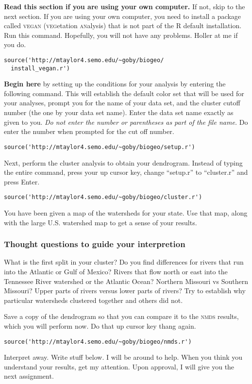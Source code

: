\documentclass[11pt]{article}
\begin{document}
\textbf{Read this section if you are using your own computer.} If not, skip to the next section. 
If you are using your own computer, you need to install a package called \textsc{vegan} (\textsc{veg}etation
\textsc{an}alysis) that is not part of the R default installation. Run this command.  Hopefully, you will not have any problems. Holler at me if you do.

\begin{verbatim}
source('http://mtaylor4.semo.edu/~goby/biogeo/
  install_vegan.r')
\end{verbatim}

\textbf{Begin here} by setting up the conditions for your analysis by 
entering the following command.  This will establish the default color 
set that will be used for your analyses, prompt you for the name of your data set,
and the cluster cutoff number (the one by your data set name). Enter the data set
name exactly as given to you. \emph{Do not enter the number or parentheses as part of the file name.} 
Do enter the number when prompted for the cut off number.

\begin{verbatim}
source('http://mtaylor4.semo.edu/~goby/biogeo/setup.r')
\end{verbatim}

Next, perform the cluster analysis to obtain your dendrogram. Instead of typing the entire command,
press your up cursor key, change ``setup.r'' to ``cluster.r'' and press Enter.

\begin{verbatim}
source('http://mtaylor4.semo.edu/~goby/biogeo/cluster.r')
\end{verbatim}

You have been given a map of the watersheds for your state.  Use that map, along with the large U.S. watershed map to 
get a sense of your results. %

\subsubsection*{Thought questions to guide your interpretion}

What is the first split in your cluster? Do you find differences for rivers that run into the Atlantic or Gulf of Mexico? Rivers that flow north or east into the Tennessee River watershed or the Atlantic Ocean? Northern Missouri vs Southern Missouri?  Upper parts of rivers versus lower parts of rivers? Try to establish why particular watersheds clustered together and others did not.

Save a copy of the dendrogram so that you can compare it to the \textsc{nmds} results, which you will perform now.
Do that up cursor key thang again.

\begin{verbatim}
source('http://mtaylor4.semo.edu/~goby/biogeo/nmds.r')
\end{verbatim}

Interpret away. Write stuff below. I will be around to help. When you think you understand your results, get my attention. Upon approval, I will give you the next assignment.
\end{document}
